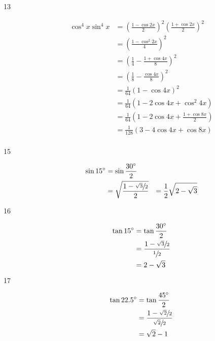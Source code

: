 \documentclass{exam}
\newcommand{\dg}{\ensuremath{^\circ}}
\begin{document}
\begin{description}
      \item[13]
        \begin{align*}
          \cos^4 x \sin^4 x & = \left( \frac{1 - \cos 2x}{2} \right)^2 \left( \frac{1 + \cos 2x}{2} \right)^2 \\
                            & = \left( \frac{1 - \cos^2 2x}{4} \right)^2 \\
                            & = \left( \frac{1}{4} - \frac{1 + \cos 4x}{8} \right)^2 \\
                            & = \left( \frac{1}{8} - \frac{\cos 4x}{8} \right)^2 \\
                            & = \frac{1}{64} \left( 1 - \cos 4x \right)^2 \\
                            & = \frac{1}{64} \left( 1 - 2 \cos 4x + \cos^2 4x \right) \\
                            & = \frac{1}{64} \left( 1 - 2 \cos 4x + \frac{1 + \cos 8x}{2} \right) \\
                            & = \frac{1}{128} \left( 3 - 4 \cos 4x + \cos 8x \right) \\
        \end{align*}

      \item[15]
        \begin{align*}
          \sin 15 \dg & = \sin \frac{30 \dg}{2} \\
                      & = \sqrt{  \frac{1 - \sfrac{\sqrt{3}}{2}}{2} }
                      & = \frac{1}{2} \sqrt{2 - \sqrt{3}} \\
        \end{align*}

      \item[16]
        \begin{align*}
          \tan 15 \dg & = \tan \frac{30 \dg}{2} \\
                      & = \frac{ 1 - \sfrac{\sqrt{3}}{2} }{ \sfrac{1}{2} } \\
                      & = 2 - \sqrt{3}
        \end{align*}

      \item[17]
        \begin{align*}
          \tan 22.5 \dg & = \tan \frac{45 \dg}{2} \\
                        & = \frac{1 - \sfrac{\sqrt{2}}{2}}{\sfrac{\sqrt{2}}{2}} \\
                        & = \sqrt{2} - 1 \\
        \end{align*}


\end{description}
\end{document}
